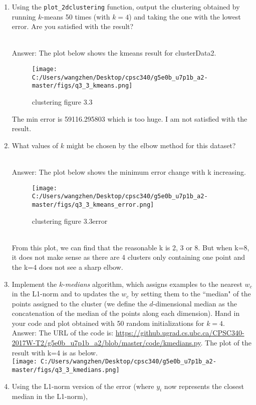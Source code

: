 \documentclass{article}
\def\blu#1{{\color{blu}#1}}
\def\enum#1{\begin{enumerate}#1\end{enumerate}}
\begin{document}
 \blu{\enum{
 \item Using the \texttt{plot\_2dclustering} function, output the clustering obtained by running $k$-means 50 times (with $k=4$)  and taking the one with the lowest error. Are you satisfied with the result?
 \textcolor{gre}{\\Answer: The plot below shows the kmeans result for clusterData2.\\
  \begin{figure}[h!]
 \texttt{[image: C:/Users/wangzhen/Desktop/cpsc340/g5e0b\_u7p1b\_a2-master/figs/q3\_3\_kmeans.png]}\\
\caption{clustering figure 3.3}
\end{figure}
 The min error is 59116.295803 which is too huge. I am not satisfied with the result.
 }
 \item What values of $k$ might be chosen by the elbow method for this dataset?
 \textcolor{gre}{\\Answer: The plot below shows the minimum error change with k increasing.\\
 \begin{figure}[h!]
 \texttt{[image: C:/Users/wangzhen/Desktop/cpsc340/g5e0b\_u7p1b\_a2-master/figs/q3\_3\_kmeans\_error.png]}\\
\caption{clustering figure 3.3error}
\end{figure}
\\From this plot, we can find that the reasonable k is 2, 3 or 8. But when k=8, it does not make sense as there are 4 clusters only containing one point and the k=4 does not see a sharp elbow.}
 \item Implement the $k$-\emph{medians} algorithm, which assigns examples to the nearest $w_c$ in the L1-norm and to updates the $w_c$ by setting them to the ``median" of the points assigned to the cluster (we define the $d$-dimensional median as the concatenation of the median of the points along each dimension). Hand in your code and plot obtained with 50 random initializations for $k = 4$.
 \textcolor{gre}{\\Answer: The URL of the code is: \url{https://github.ugrad.cs.ubc.ca/CPSC340-2017W-T2/g5e0b_u7p1b_a2/blob/master/code/kmedians.py}. The plot of the result with k=4 is as below.\\\texttt{[image: C:/Users/wangzhen/Desktop/cpsc340/g5e0b\_u7p1b\_a2-master/figs/q3\_3\_kmedians.png]}\\}
\item Using the L1-norm version of the error (where $y_i$ now represents the closest median in the L1-norm),
}}
\end{document}
